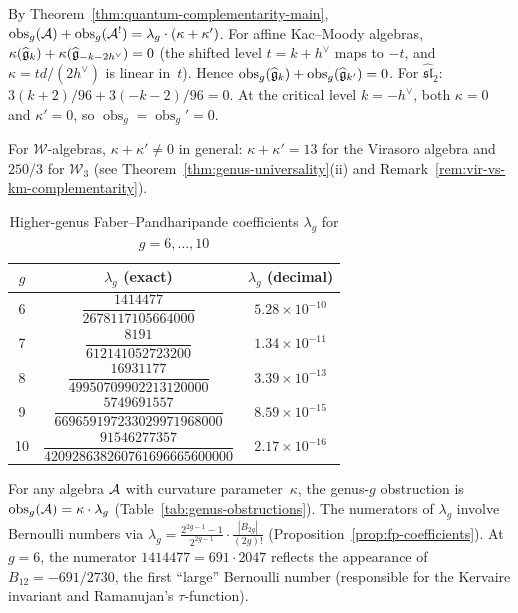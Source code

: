 \begin{remark}\label{rem:genus-complementarity}
By Theorem~\ref{thm:quantum-complementarity-main},
$\operatorname{obs}_g(\mathcal{A}) + \operatorname{obs}_g(\mathcal{A}^!)
 = \lambda_g \cdot (\kappa + \kappa')$.
For affine Kac--Moody algebras,
$\kappa(\widehat{\mathfrak{g}}_k) + \kappa(\widehat{\mathfrak{g}}_{-k-2h^\vee}) = 0$
(the shifted level $t = k + h^\vee$ maps to $-t$, and
$\kappa = td/(2h^\vee)$ is linear in~$t$).
Hence $\operatorname{obs}_g(\widehat{\mathfrak{g}}_k)
 + \operatorname{obs}_g(\widehat{\mathfrak{g}}_{k'}) = 0$.
For $\widehat{\mathfrak{sl}}_2$:
$3(k{+}2)/96 + 3(-k{-}2)/96 = 0$.
At the critical level $k = -h^\vee$, both $\kappa = 0$ and $\kappa' = 0$,
so $\operatorname{obs}_g = \operatorname{obs}_g' = 0$.

For $\mathcal{W}$-algebras, $\kappa + \kappa' \neq 0$ in general:
$\kappa + \kappa' = 13$ for the Virasoro algebra and $250/3$ for
$\mathcal{W}_3$ (see Theorem~\ref{thm:genus-universality}(ii)
and Remark~\ref{rem:vir-vs-km-complementarity}).
\end{remark}

\begin{table}[ht]
\centering
\caption{Higher-genus Faber--Pandharipande coefficients $\lambda_g$ for $g = 6, \ldots, 10$}
\label{tab:genus-obstructions-high}
\renewcommand{\arraystretch}{1.5}
{\footnotesize
\begin{tabular}{|c|c|c|}
\hline
$g$ & $\lambda_g$ (exact) & $\lambda_g$ (decimal) \\
\hline
6 & $\dfrac{1414477}{2678117105664000}$ & $5.28 \times 10^{-10}$ \\[6pt]
\hline
7 & $\dfrac{8191}{612141052723200}$ & $1.34 \times 10^{-11}$ \\[6pt]
\hline
8 & $\dfrac{16931177}{49950709902213120000}$ & $3.39 \times 10^{-13}$ \\[6pt]
\hline
9 & $\dfrac{5749691557}{669659197233029971968000}$ & $8.59 \times 10^{-15}$ \\[6pt]
\hline
10 & $\dfrac{91546277357}{420928638260761696665600000}$ & $2.17 \times 10^{-16}$ \\[6pt]
\hline
\end{tabular}
}
\end{table}

\noindent
For any algebra $\mathcal{A}$ with curvature parameter~$\kappa$,
the genus-$g$ obstruction is $\operatorname{obs}_g(\mathcal{A}) = \kappa \cdot \lambda_g$
(Table~\ref{tab:genus-obstructions}).  The numerators of
$\lambda_g$ involve Bernoulli numbers via
$\lambda_g = \tfrac{2^{2g-1}-1}{2^{2g-1}} \cdot
\tfrac{|B_{2g}|}{(2g)!}$
(Proposition~\ref{prop:fp-coefficients}).
At $g = 6$, the numerator $1414477 = 691 \cdot 2047$ reflects the
appearance of $B_{12} = -691/2730$, the first ``large'' Bernoulli
number (responsible for the Kervaire invariant and Ramanujan's
$\tau$-function).

